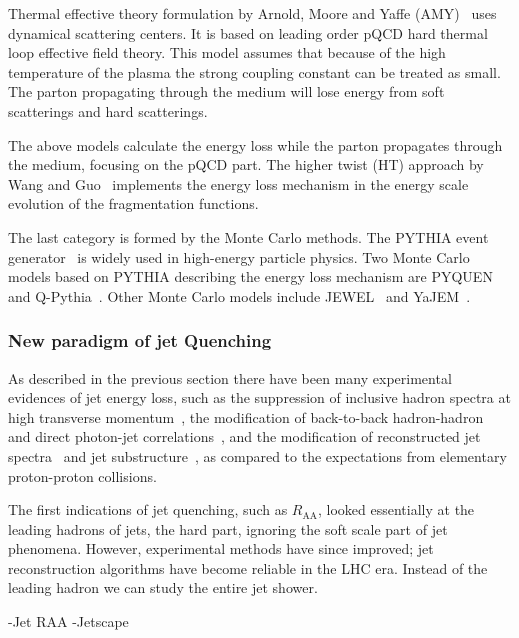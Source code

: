 Thermal effective theory formulation by Arnold, Moore and Yaffe (AMY)~\cite{Arnold:2001ms} uses dynamical scattering centers. It is based on leading order pQCD hard thermal loop effective field theory. This model assumes that because of the high temperature of the plasma the strong coupling constant can be treated as small. The parton propagating through the medium will lose energy from soft scatterings and hard scatterings.

The above models calculate the energy loss while the parton propagates through the medium, focusing on the pQCD part. The higher twist (HT) approach by Wang and Guo~\cite{Wang:2001ifa} implements the energy loss mechanism in the energy scale evolution of the fragmentation functions.

The last category is formed by the Monte Carlo methods. The PYTHIA event generator~\cite{pythia} is widely used in high-energy particle physics. Two Monte Carlo models based on PYTHIA describing the energy loss mechanism are PYQUEN~\cite{Lokhtin:2005px} and Q-Pythia~\cite{Armesto:2009zc}. Other Monte Carlo models include JEWEL~\cite{Zapp:2008gi} and YaJEM~\cite{Renk:2009nz}.



\subsubsection{New paradigm of jet Quenching}
As described in the previous section there have been many experimental evidences of jet energy loss, such as the suppression of inclusive hadron spectra at high transverse momentum~\cite{Adcox:2001jp,Adams:2003im,Arsene:2003yk,Khachatryan:2016odn,Acharya:2018qsh}, the modification of back-to-back hadron-hadron~\cite{Adare:2007vu,Aamodt:2011vg} and direct photon-jet correlations~\cite{Adare:2012qi}, and the modification of reconstructed jet spectra~\cite{Adam:2015ewa} and jet substructure~\cite{Sirunyan:2018qec,Chatrchyan:2014ava,Acharya:2018uvf}, as compared to the expectations from elementary proton-proton collisions.


The first indications of jet quenching, such as $R_{\mathrm{AA}}$, looked essentially at the leading hadrons of jets, the hard part, ignoring the soft scale part of jet phenomena. However, experimental methods have since improved; jet reconstruction algorithms have become reliable in the LHC era. Instead of the leading hadron we can study the entire jet shower. 

-Jet RAA
-Jetscape

